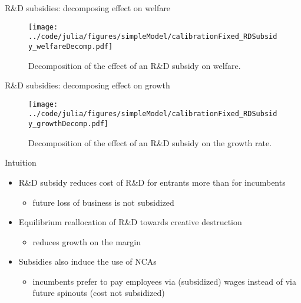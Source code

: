 \documentclass[english,usenames,dvipsnames]{beamer}
\begin{document}
\begin{frame}{R\&D subsidies: decomposing effect on welfare} \label{plots:rd_subsidies1} 
	\hyperlink{RDsubsidy_table}{}
	\begin{figure}[]
		\texttt{[image: ../code/julia/figures/simpleModel/calibrationFixed\_RDSubsidy\_welfareDecomp.pdf]}
		\caption{Decomposition of the effect of an R\&D subsidy on welfare.}
		\label{calibration_RDSubsidy_welfareDecomp}
	\end{figure}
\end{frame}

\begin{frame}{R\&D subsidies: decomposing effect on growth} \label{plots:rd_subsidies2} 
	\hyperlink{RDsubsidy_table}{}
	\begin{figure}[]
		\texttt{[image: ../code/julia/figures/simpleModel/calibrationFixed\_RDSubsidy\_growthDecomp.pdf]}
		\caption{Decomposition of the effect of an R\&D subsidy on the growth rate.}
		\label{calibration_RDSubsidy_growthDecomp}
	\end{figure}
\end{frame}

\begin{frame}{Intuition}\label{rd_subsidies:intuition}
	\hyperlink{RDsubsidy_table}{}
	\begin{itemize}
		\item <+-> R\&D subsidy reduces cost of R\&D for entrants more than for incumbents
		\begin{itemize}
			\item future loss of business is not subsidized
		\end{itemize}
		\medskip
		\item <+-> Equilibrium reallocation of R\&D towards creative destruction
		\begin{itemize}
			\item reduces growth on the margin
		\end{itemize}
		\medskip
		\item <+-> Subsidies also induce the use of NCAs
		\begin{itemize}
			\item incumbents prefer to pay employees via (subsidized) wages instead of via future spinouts (cost not subsidized)
		\end{itemize}
	\end{itemize}
\end{frame}
\end{document}
